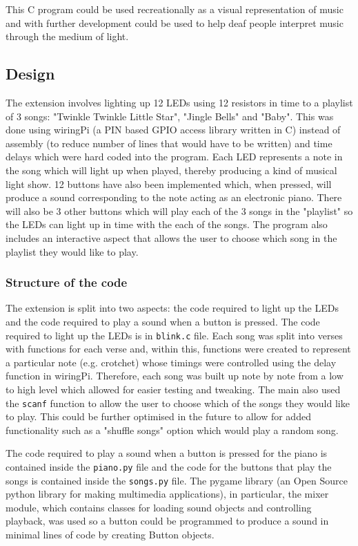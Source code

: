 \documentclass[11pt]{article}
\begin{document}
This C program could be used recreationally as a visual representation of music and with further development could be used to help deaf people interpret music through the medium of light.

\subsection{Design}

The extension involves lighting up 12 LEDs using 12 resistors in time to a playlist of 3 songs: "Twinkle Twinkle Little Star", "Jingle Bells" and "Baby". This was done using wiringPi (a PIN based GPIO access library written in C) instead of assembly (to reduce number of lines that would have to be written) and time delays which were hard coded into the program. Each LED represents a note in the song which will light up when played, thereby producing a kind of musical light show. 12 buttons have also been implemented which, when pressed, will produce a sound corresponding to the note acting as an electronic piano. There will also be 3 other buttons which will play each of the 3 songs in the "playlist" so the LEDs can light up in time with the each of the songs. The program also includes an interactive aspect that allows the user to choose which song in the playlist they would like to play.

\subsubsection{Structure of the code}

The extension is split into two aspects: the code required to light up the LEDs and the code required to play a sound when a button is pressed. The code required to light up the LEDs is in \texttt{blink.c} file. Each song was split into verses with functions for each verse and, within this, functions were created to represent a particular note (e.g. crotchet) whose timings were controlled using the delay function in wiringPi. Therefore, each song was built up note by note from a low to high level which allowed for easier testing and tweaking. The main also used the \texttt{scanf} function to allow the user to choose which of the songs they would like to play. This could be further optimised in the future to allow for added functionality such as a "shuffle songs" option which would play a random song.

The code required to play a sound when a button is pressed for the piano is contained inside the \texttt{piano.py} file and the code for the buttons that play the songs is contained inside the \texttt{songs.py} file. The pygame library (an Open Source python library for making multimedia applications), in particular, the mixer module, which contains classes for loading sound objects and controlling playback, was used so a button could be programmed to produce a sound in minimal lines of code by creating Button objects.
\end{document}
